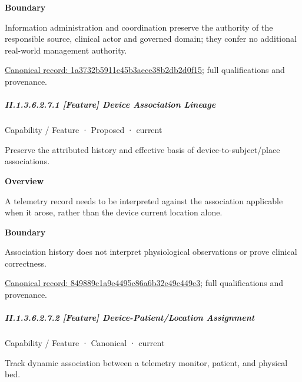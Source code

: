 \textbf{Boundary}



Information administration and coordination preserve the authority of the responsible source, clinical actor and governed domain; they confer no additional real-world management authority.


{\footnotesize \href{../../../../continuum/strategy/capability/1a3732b5911c45b3aece38b2db2d0f15.md}{Canonical record: 1a3732b5911c45b3aece38b2db2d0f15}; full qualifications and provenance.}\par
\subparagraph*{II.1.3.6.2.7.1 [Feature] Device Association Lineage}
\label{navigation:II.1.3.6.2.7.1}

\label{element:849889c1a9e4495c86a6b32e49c449e3}
{\small Capability / Feature · Proposed · current}\par

Preserve the attributed history and effective basis of device-to-subject/place associations.



\textbf{Overview}



A telemetry record needs to be interpreted against the association applicable when it arose, rather than the device current location alone.



\textbf{Boundary}



Association history does not interpret physiological observations or prove clinical correctness.


{\footnotesize \href{../../../../continuum/strategy/capability/feature/849889c1a9e4495c86a6b32e49c449e3.md}{Canonical record: 849889c1a9e4495c86a6b32e49c449e3}; full qualifications and provenance.}\par
\subparagraph*{II.1.3.6.2.7.2 [Feature] Device-Patient/Location Assignment}
\label{navigation:II.1.3.6.2.7.2}

\label{element:891ed75bdd3c490296e5f0b7cacf6c87}
{\small Capability / Feature · Canonical · current}\par

Track dynamic association between a telemetry monitor, patient, and physical bed.




